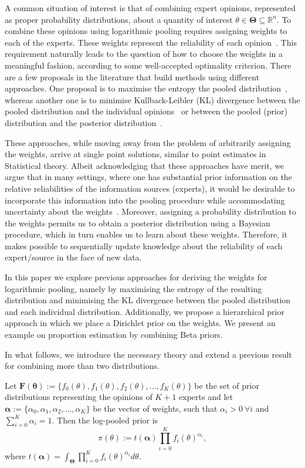 \documentclass[a4paper, notitlepage, 11pt]{article}
\begin{document}
A common situation of interest is that of combining expert opinions, represented as proper probability distributions, about a quantity of interest $\theta \in \mathbf{\Theta} \subseteq \mathbb{R}^n$.
To combine these opinions using logarithmic pooling requires assigning weights to each of the experts.
These weights represent the reliability of each opinion~\citep{genest1984}.
This requirement naturally leads to the question of how to choose the weights in a meaningful fashion, according to some well-accepted optimality criterion.
There are a few proposals in the literature that build methods using different approaches.
One proposal is to maximise the entropy the pooled distribution~\citep{myung1996}, whereas another one is to minimise Kullback-Leibler (KL) divergence between the pooled distribution and the individual opinions~\citep{abbas2009} or between the pooled (prior) distribution and the posterior distribution~\citep{rufo2012A,rufo2012B}.

These approaches, while moving away from the problem of arbitrarily assigning the weights, arrive at single point solutions, similar to point estimates in Statistical theory.
Albeit acknowledging that these approaches have merit, we argue that in many settings, where one has substantial prior information on the relative reliabilities of the information sources (experts), it would be desirable to incorporate this information into the pooling procedure while accommodating uncertainty about the weights~\citep{poole2000}.
Moreover, assigning a probability distribution to the weights permits us to obtain a posterior distribution using a Bayesian procedure, which in turn enables us to learn about these weights.
Therefore, it makes possible to sequentially update knowledge about the reliability of each expert/source in the face of new data.

In this paper we explore previous approaches for deriving the weights for logarithmic pooling, namely by maximising the entropy of the resulting distribution and minimising the KL divergence between the pooled distribution and each individual distribution.
Additionally, we propose a hierarchical prior approach in which we place a Dirichlet prior on the weights.
We present an example on proportion estimation by combining Beta priors.

In what follows, we introduce the necessary theory and extend a previous 
result~\citep{poole2000} for combining more than two distributions.

Let $\mathbf{F(\theta)} := \{f_0(\theta), f_1(\theta), f_2(\theta), \ldots, f_K(\theta)\}$ be the set of prior distributions representing the opinions of $K+1$ experts and let $\boldsymbol\alpha :=\{\alpha_0, \alpha_1, \alpha_2, \ldots, \alpha_K \}$ be the vector of weights, such that $\alpha_i > 0\: \forall i$ and $\sum_{i=0}^K \alpha_i = 1$.
Then the log-pooled prior is
\begin{equation}
\label{eq:logpool}
 \pi(\theta) := t(\boldsymbol\alpha) \prod_{i=0}^K f_i(\theta)^{\alpha_i},
\end{equation}
where $t(\boldsymbol\alpha) = \int_{\boldsymbol\Theta}\prod_{i=0}^K f_i(\theta)^{\alpha_i}d\theta$.
\end{document}
